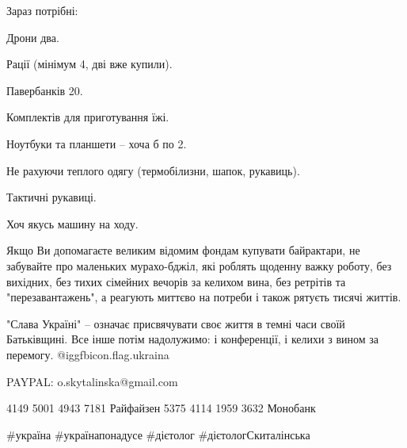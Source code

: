 Зараз потрібні:

Дрони два.

Рації (мінімум 4, дві вже купили).

Павербанків 20.

Комплектів для приготування їжі.

Ноутбуки та планшети -- хоча б по 2.

Не рахуючи теплого одягу (термобілизни, шапок, рукавиць).

Тактичні рукавиці.

Хоч якусь машину на ходу. 

Якщо Ви допомагаєте великим відомим фондам купувати байрактари, не забувайте
про маленьких мурахо-бджіл, які роблять щоденну важку роботу, без вихідних, без
тихих сімейних вечорів за келихом вина, без ретрітів та "перезавантажень", а
реагують миттєво на потреби і також рятуєть тисячі життів.

"Слава Україні" -- означає присвячувати своє життя в темні часи своїй
Батьківщині. Все інше потім надолужимо: і конференції, і келихи з вином за
перемогу.
@igg{fbicon.flag.ukraina}

PAYPAL: o.skytalinska@gmail.com

4149 5001 4943 7181 Райфайзен
5375 4114 1959 3632 Монобанк

\#україна \#українапонадусе \#дієтолог \#дієтологСкиталінська

